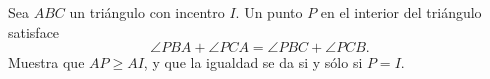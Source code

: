 Sea $ABC$ un triángulo con incentro $I$. Un punto $P$ en el interior del triángulo satisface \[\angle PBA+\angle PCA = \angle PBC+\angle PCB.\] 
Muestra que $AP\geq AI$, y que la igualdad se da si y sólo si $P=I$.